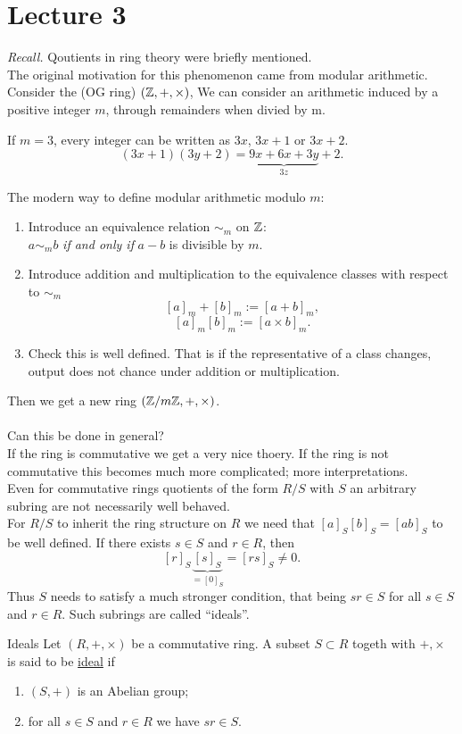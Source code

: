 \documentclass[twoside, openright, fontsize=10pt, headings=big]{scrbook}
\begin{document}
\chapter{Lecture 3}
\textit{Recall.} Qoutients in ring theory were briefly mentioned.\\
The original motivation for this phenomenon came from modular arithmetic.\\
Consider the (OG ring) $(\mathbb{Z},+,\times)$, We can consider an arithmetic induced by a positive integer $m$, through remainders when divied by m.\\
\begin{example}{}{}
    If $m=3$, every integer can be written as $3x$, $3x+1$ or $3x+2$.
    \[
      (3x+1)(3y+2)=\underbrace{9x+6x+3y}_{3z}+2.  
    \]
\end{example}
The modern way to define modular arithmetic modulo $m$:
\begin{enumerate}
    \item Introduce an equivalence relation $\sim_m$ on $\mathbb{Z}$:\\
    $a\sim_m b$ \textit{if and only if} $a-b$ is divisible by $m$.
    \item Introduce addition and multiplication to the equivalence classes with respect to $\sim_m$
    \[
        [a]_m+[b]_m:=[a+b]_m,
    \]
    \[
        [a]_m[b]_m:=[a\times b]_m.
    \]
    \item Check this is well defined. That is if the representative of a class changes, output does not chance under addition or multiplication.
\end{enumerate}
Then we get a new ring $(\mathbb{Z}/m\mathbb{Z},+,\times)$.\\\\
Can this be done in general?\\
If the ring is commutative we get a very nice thoery. If the ring is not commutative this becomes much more complicated; more interpretations.\\
Even for commutative rings quotients of the form $R/S$ with $S$ an arbitrary subring are not necessarily well behaved.\\
For $R/S$ to inherit the ring structure on $R$ we need that $[a]_S[b]_S=[ab]_S$ to be well defined. If there exists $s\in S$ and $r\in R$, then
\[
    [r]_S\underbrace{[s]_S}_{=[0]_S}=[rs]_S\neq0.
\]
Thus $S$ needs to satisfy a much stronger condition, that being $sr\in S$ for all $s\in S$ and $r\in R$. Such subrings are called ``ideals''.
\begin{definition}{Ideals}{}
    Let $(R,+,\times)$ be a commutative ring. A subset $S\subset R$ togeth with $+,\times$ is said to be \underline{ideal} if 
    \begin{enumerate}
        \item $(S,+)$ is an Abelian group;
        \item for all $s\in S$ and $r\in R$ we have $sr\in S$. 
    \end{enumerate}
\end{definition}
\end{document}
